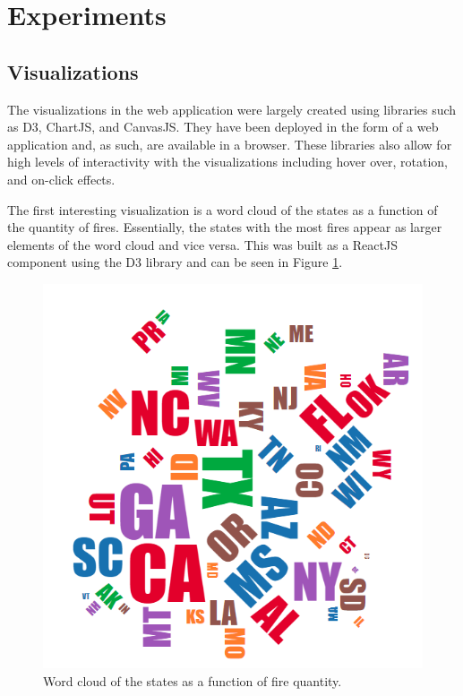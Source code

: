 \documentclass[conference]{IEEEtran}
\begin{document}
\section{Experiments}
\subsection{Visualizations}
The visualizations in the web application were largely created using libraries such as D3, ChartJS, and CanvasJS. They have been deployed in the form of a web application and, as such, are available in a browser. These libraries also allow for high levels of interactivity with the visualizations including hover over, rotation, and on-click effects. \par

The first interesting visualization is a word cloud of the states as a function of the quantity of fires. Essentially, the states with the most fires appear as larger elements of the word cloud and vice versa. This was built as a ReactJS component using the D3 library and can be seen in Figure \ref{fig:wordcloud}.

\begin{figure}
    \centering
    \includegraphics{img/wordcloud.PNG}
    \caption{Word cloud of the states as a function of fire quantity.}
    \label{fig:wordcloud}
\end{figure}
\end{document}
